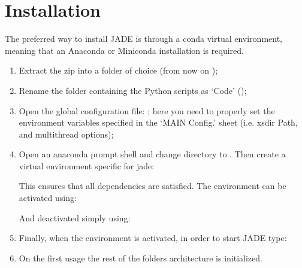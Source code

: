 \documentclass[letterpaper,10pt,english]{sphinxmanual}
\begin{document}
\chapter{Installation}
\label{\detokenize{usage/installation:installation}}\label{\detokenize{usage/installation:install}}\label{\detokenize{usage/installation::doc}}
The preferred way to install JADE is through a conda virtual environment, meaning that an
Anaconda or Miniconda installation is required.
\begin{enumerate}
%
\item {} 
Extract the zip into a folder of choice (from now on );

\item {} 
Rename the folder containing the Python scripts as ‘Code’ ();

\item {} 
Open the global configuration file: ;
here you need to properly set the environment variables specified in the ‘MAIN Config.’ sheet (i.e. xsdir Path, and multithread options);

\item {} 
Open an anaconda prompt shell and change directory to . Then create a virtual
environment specific for jade:


This ensures that all dependencies are satisfied. The environment can be activated using:


And deactivated simply using:


\item {} 
Finally, when the environment is activated, in order to start JADE type:


\item {} 
On the first usage the rest of the folders architecture is initialized.

\end{enumerate}
\end{document}
